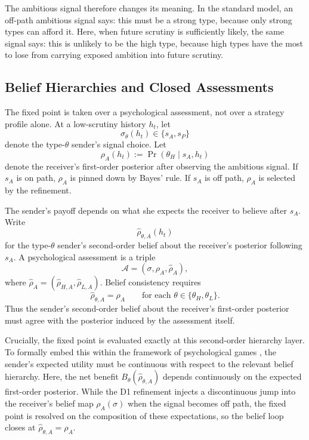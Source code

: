 The ambitious signal therefore changes its meaning. In the standard model, an off-path ambitious signal says: this must be a strong type, because only strong types can afford it. Here, when future scrutiny is sufficiently likely, the same signal says: this is unlikely to be the high type, because high types have the most to lose from carrying exposed ambition into future scrutiny.

\subsection{Belief Hierarchies and Closed Assessments}
\label{subsec:belief-hierarchy}

The fixed point is taken over a psychological assessment, not over a strategy profile alone. At a low-scrutiny history \(h_t\), let
\[
\sigma_\theta(h_t)\in\{s_A,s_P\}
\]
denote the type-\(\theta\) sender's signal choice. Let
\[
\rho_A(h_t):=\Pr(\theta_H\mid s_A,h_t)
\]
denote the receiver's first-order posterior after observing the ambitious signal. If \(s_A\) is on path, \(\rho_A\) is pinned down by Bayes' rule. If \(s_A\) is off path, \(\rho_A\) is selected by the refinement.

The sender's payoff depends on what she expects the receiver to believe after \(s_A\). Write
\[
\widehat \rho_{\theta,A}(h_t)
\]
for the type-\(\theta\) sender's second-order belief about the receiver's posterior following \(s_A\). A psychological assessment is a triple
\[
\mathcal A=(\sigma,\rho_A,\widehat \rho_A),
\]
where \(\widehat \rho_A=(\widehat\rho_{H,A},\widehat\rho_{L,A})\). Belief consistency requires
\[
\widehat\rho_{\theta,A}=\rho_A
\qquad\text{for each }\theta\in\{\theta_H,\theta_L\}.
\]
Thus the sender's second-order belief about the receiver's first-order posterior must agree with the posterior induced by the assessment itself.

Crucially, the fixed point is evaluated exactly at this second-order hierarchy layer. To formally embed this within the framework of psychological games \citep{battigalli2009dynamic}, the sender's expected utility must be continuous with respect to the relevant belief hierarchy. Here, the net benefit \(B_\theta(\widehat{\rho}_{\theta,A})\) depends continuously on the expected first-order posterior. While the D1 refinement injects a discontinuous jump into the receiver's belief map \(\rho_A(\sigma)\) when the signal becomes off path, the fixed point is resolved on the composition of these expectations, so the belief loop closes at \(\widehat\rho_{\theta,A}=\rho_A\).

